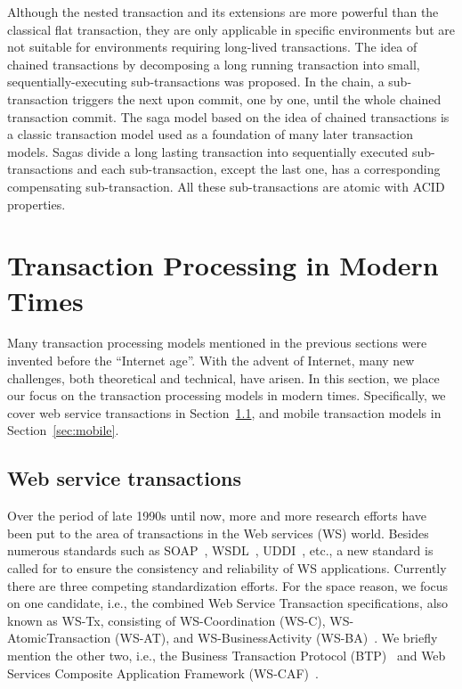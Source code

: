 \documentclass{sig-alternate-05-2015}
\begin{document}
Although the nested transaction and its extensions are more powerful than the classical flat transaction, they are only applicable in specific environments but are not suitable for environments requiring long-lived transactions. The idea of chained transactions by decomposing a long running transaction into small, sequentially-executing sub-transactions was proposed. In the chain, a sub-transaction triggers the next upon commit, one by one, until the whole chained transaction commit. The saga model \cite{garcia1987sagas} based on the idea of chained transactions is a classic transaction model used as a foundation of many later transaction models. Sagas divide a long lasting transaction into sequentially executed sub-transactions and each sub-transaction, except the last one, has a corresponding compensating sub-transaction. All these sub-transactions are atomic with ACID properties.


\section{Transaction Processing in Modern Times}
\label{sec:modern}

Many transaction processing models mentioned in the previous sections
were invented before the ``Internet age''. With the advent of
Internet, many new challenges, both theoretical and technical, have
arisen. In this section, we place our focus on the transaction
processing models in modern times. Specifically, we cover web service
transactions in Section~\ref{sec:web}, and mobile transaction models
in Section~\ref{sec:mobile}.

\subsection{Web service transactions}
\label{sec:web}

Over the period of late 1990s until now, more and more research
efforts have been put to the area of transactions in the Web services
(WS) world. Besides numerous standards such as SOAP~\cite{soap},
WSDL~\cite{wsdl}, UDDI~\cite{uddi}, etc., a new standard is called for
to ensure the consistency and reliability of WS
applications. Currently there are three competing standardization
efforts. For the space reason, we focus on one candidate, i.e., the
combined Web Service Transaction specifications, also known as WS-Tx,
consisting of WS-Coordination (WS-C), WS-AtomicTransaction (WS-AT),
and WS-BusinessActivity (WS-BA)~\cite{wsc, wsat, wsba}. We briefly
mention the other two, i.e., the Business Transaction Protocol
(BTP)~\cite{btp} and Web Services Composite Application Framework
(WS-CAF)~\cite{wscaf}.
\end{document}
